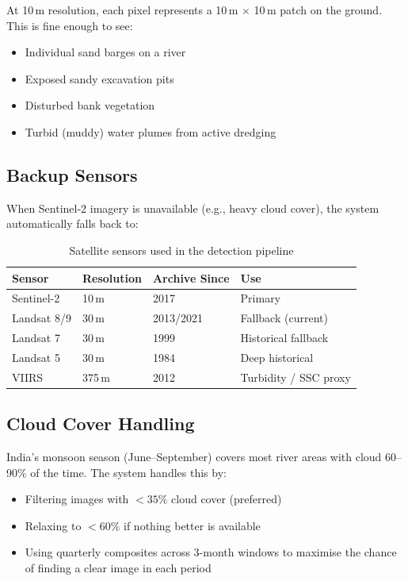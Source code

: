 \documentclass[12pt, a4paper]{article}
\begin{document}
At 10\,m resolution, each pixel represents a 10\,m $\times$ 10\,m patch
on the ground. This is fine enough to see:
\begin{itemize}[noitemsep]
  \item Individual sand barges on a river
  \item Exposed sandy excavation pits
  \item Disturbed bank vegetation
  \item Turbid (muddy) water plumes from active dredging
\end{itemize}

\subsection{Backup Sensors}

When Sentinel-2 imagery is unavailable (e.g., heavy cloud cover), the
system automatically falls back to:

\begin{table}[H]
\centering
\begin{tabular}{llll}
\toprule
\textbf{Sensor} & \textbf{Resolution} & \textbf{Archive Since} & \textbf{Use} \\
\midrule
Sentinel-2 & 10\,m & 2017 & Primary \\
Landsat 8/9 & 30\,m & 2013/2021 & Fallback (current) \\
Landsat 7 & 30\,m & 1999 & Historical fallback \\
Landsat 5 & 30\,m & 1984 & Deep historical \\
VIIRS & 375\,m & 2012 & Turbidity / SSC proxy \\
\bottomrule
\end{tabular}
\caption{Satellite sensors used in the detection pipeline}
\end{table}

\subsection{Cloud Cover Handling}

India's monsoon season (June--September) covers most river areas with
cloud 60--90\% of the time. The system handles this by:
\begin{itemize}[noitemsep]
  \item Filtering images with $<35\%$ cloud cover (preferred)
  \item Relaxing to $<60\%$ if nothing better is available
  \item Using quarterly composites across 3-month windows to maximise
        the chance of finding a clear image in each period
\end{itemize}
\end{document}
